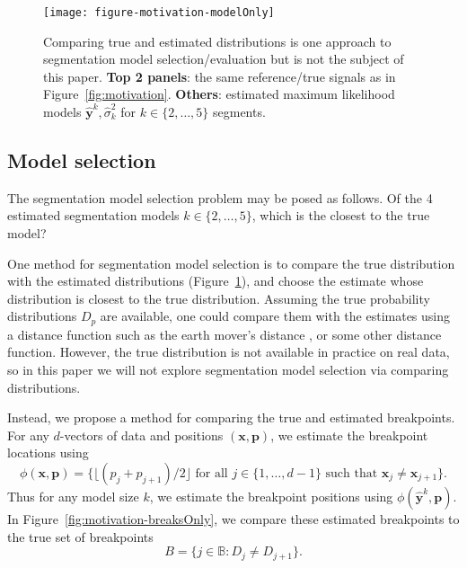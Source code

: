 \documentclass{jsfds} %
\begin{document}
\begin{figure}[H]
  \centering
  \texttt{[image: figure-motivation-modelOnly]}
  \vskip -0.5cm
  \caption{Comparing true and estimated distributions is one approach
    to segmentation model selection/evaluation but is not the subject
    of this paper. \textbf{Top 2 panels}: the same reference/true
    signals as in Figure~\ref{fig:motivation}. \textbf{Others}:
    estimated maximum likelihood models $\mathbf{\hat y}^k,\hat
    \sigma^2_k$ for $k\in\{2, \dots, 5\}$ segments.}
  \label{fig:motivation-modelOnly}
\end{figure}

\subsection{Model selection}

The segmentation model selection problem may be posed as follows. Of
the 4 estimated segmentation models $k\in\{2, \dots, 5\}$, which is
the closest to the true model?

\newpage

One method for segmentation model selection is to compare the true
distribution with the estimated distributions
(Figure~\ref{fig:motivation-modelOnly}), and choose the estimate whose
distribution is closest to the true distribution. Assuming the true
probability distributions $D_p$ are available, one could compare them
with the estimates using a distance function such as the earth mover's
distance \citep{earth-mover}, or some other distance
function. However, the true distribution is not available in practice
on real data, so in this paper we will not explore segmentation model
selection via comparing distributions.

Instead, we propose a method for comparing the true and estimated
breakpoints. For any $d$-vectors of data and positions $(\mathbf x,
\mathbf p)$, we estimate the breakpoint locations using
\begin{equation}
  \label{eq:breaks_phi}
\phi(\mathbf{x}, \mathbf p)
= \big\{
\lfloor 
(p_j+p_{j+1})/2
\rfloor
\text{ for all }j\in\{1,\dots,d-1\}\text{ such that }
\mathbf x_j\neq \mathbf x_{j+1}
\big\}.
\end{equation}
Thus for any model size $k$, we estimate the breakpoint positions
using $\phi(\mathbf{\hat y}^k, \mathbf p)$.
In Figure~\ref{fig:motivation-breaksOnly}, we compare
these estimated breakpoints to the true set of breakpoints
\begin{equation}
  \label{eq:breaks_B}
  B = \{j\in\mathbb B:D_j\neq D_{j+1}\}.
\end{equation}
\end{document}
